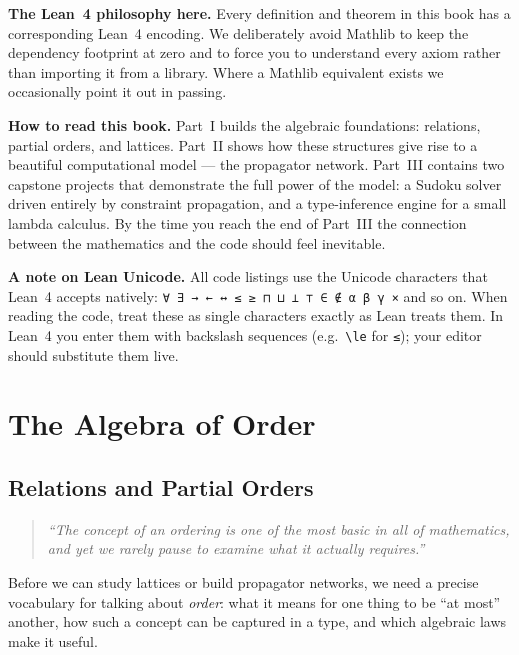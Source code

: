 \documentclass[12pt, a4paper, openright]{book}
\theoremstyle{thmstyle}
\theoremstyle{defstyle}
\begin{document}
\medskip
\textbf{The Lean~4 philosophy here.}
Every definition and theorem in this book has a corresponding Lean~4
encoding. We deliberately avoid Mathlib to keep the dependency footprint at
zero and to force you to understand every axiom rather than importing it from
a library. Where a Mathlib equivalent exists we occasionally point it out in
passing.

\medskip
\textbf{How to read this book.}
Part~I builds the algebraic foundations: relations, partial orders, and
lattices. Part~II shows how these structures give rise to a beautiful
computational model --- the propagator network. Part~III contains two
capstone projects that demonstrate the full power of the model: a Sudoku
solver driven entirely by constraint propagation, and a type-inference
engine for a small lambda calculus. By the time you reach the end of
Part~III the connection between the mathematics and the code should feel
inevitable.

\medskip
\textbf{A note on Lean Unicode.}
All code listings use the Unicode characters that Lean~4 accepts natively:
\texttt{∀ ∃ → ← ↔ ≤ ≥ ⊓ ⊔ ⊥ ⊤ ∈ ∉ α β γ ×} and so on. When
reading the code, treat these as single characters exactly as Lean treats
them. In Lean~4 you enter them with backslash sequences (e.g.\ \texttt{\textbackslash{}le} for \texttt{≤}); your editor should substitute them live.

\tableofcontents

\mainmatter

\part{The Algebra of Order}

\chapter{Relations and Partial Orders}

\begin{quote}
  \itshape
  ``The concept of an ordering is one of the most basic in all of
  mathematics, and yet we rarely pause to examine what it actually requires.''
\end{quote}

Before we can study lattices or build propagator networks, we need a precise
vocabulary for talking about \emph{order}: what it means for one thing to be
``at most'' another, how such a concept can be captured in a type, and which
algebraic laws make it useful.
\end{document}
